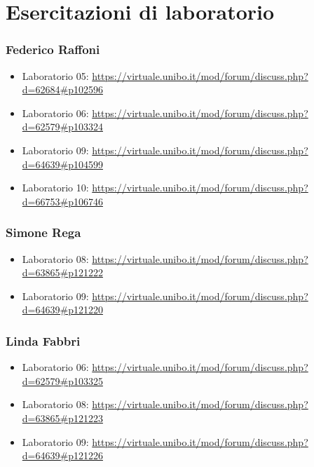 \documentclass[a4paper,12pt]{report}
\begin{document}
\chapter{Esercitazioni di laboratorio}

\subsection{Federico Raffoni}

\begin{itemize}
 \item Laboratorio 05: \url{https://virtuale.unibo.it/mod/forum/discuss.php?d=62684#p102596}
 \item Laboratorio 06: \url{https://virtuale.unibo.it/mod/forum/discuss.php?d=62579#p103324}
 \item Laboratorio 09: \url{https://virtuale.unibo.it/mod/forum/discuss.php?d=64639#p104599}
 \item Laboratorio 10: \url{https://virtuale.unibo.it/mod/forum/discuss.php?d=66753#p106746}
\end{itemize}

\subsection{Simone Rega}

\begin{itemize}
	\item Laboratorio 08: \url{https://virtuale.unibo.it/mod/forum/discuss.php?d=63865#p121222}
	\item Laboratorio 09: \url{https://virtuale.unibo.it/mod/forum/discuss.php?d=64639#p121220}
\end{itemize}

\subsection{Linda Fabbri}

\begin{itemize}
	\item Laboratorio 06:
	\url{https://virtuale.unibo.it/mod/forum/discuss.php?d=62579#p103325}
	\item Laboratorio 08: \url{https://virtuale.unibo.it/mod/forum/discuss.php?d=63865#p121223}
	\item Laboratorio 09: \url{https://virtuale.unibo.it/mod/forum/discuss.php?d=64639#p121226}
\end{itemize}


\end{document}
